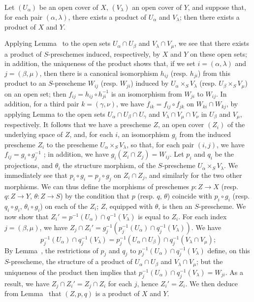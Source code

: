 \begin{lemma}[3.2.6.3]
\label{I.3.2.6.3}
Let $(U_\alpha)$ be an open cover of $X$, $(V_\lambda)$ an open cover of $Y$, and suppose
that, for each pair $(\alpha,\lambda)$, there exists a product of $U_\alpha$ and $V_\lambda$;
then there exists a product of $X$ and $Y$.
\end{lemma}

Applying Lemma~ to the open sets $U_\alpha\cap U_\beta$ and
$V_\lambda\cap V_\mu$, we see that there exists a product of $S$-preschemes induced,
respectively, by $X$ and $Y$ on these open sets; in addition, the uniqueness of the product
shows that, if we set $i=(\alpha,\lambda)$ and $j=(\beta,\mu)$, then there is a canonical
isomorphism $h_{ij}$ (resp. $h_{ji}$) from this product to an $S$-prescheme $W_{ij}$
(resp. $W_{ji}$) induced by $U_\alpha\times_S V_\lambda$ (resp. $U_\beta\times_S V_\mu$) on
an open set; then $f_{ij}=h_{ij}\circ h_{ji}^{-1}$ is an isomorphism from $W_{ji}$ to
$W_{ij}$. In addition, for a third pair $k=(\gamma,\nu)$, we have
$f_{ik}=f_{ij}\circ f_{jk}$ on
$W_{ki}\cap W_{kj}$, by applying Lemma  to
the open sets $U_\alpha\cap U_\beta\cap U_\gamma$ and $V_\lambda\cap V_\mu\cap V_\nu$ in
$U_\beta$ and $V_\mu$, respectively. It follows that we have a prescheme $Z$, an open cover
$(Z_i)$ of the underlying space of $Z$, and, for each $i$, an isomorphism $g_i$ from the
induced prescheme
$Z_i$ to the prescheme $U_\alpha\times_S V_\lambda$, so that, for each pair $(i,j)$, we have
$f_{ij}=g_i\circ g_j^{-1}$ ; in addition, we have $g_i(Z_i\cap Z_j)=W_{ij}$.
Let $p_i$ and $q_i$ be the projections, and $\theta_i$ the structure morphism, of the
$S$-prescheme $U_\alpha\times_S V_\lambda$. We immediately see that
$p_i\circ g_i=p_j\circ g_j$ on $Z_i\cap Z_j$, and similarly for the two other morphisms. We
can thus define the morphisms of preschemes $p:Z\to X$ (resp. $q:Z\to Y$, $\theta:Z\to S$) by
the condition that $p$ (resp. $q$, $\theta$) coincide with $p_i\circ g_i$
(resp. $q_i\circ g_i$, $\theta_i\circ g_i$) on each of the $Z_i$; $Z$, equipped with
$\theta$, is then an $S$-prescheme. We now show that
$Z_i'=p^{-1}(U_\alpha)\cap q^{-1}(V_\lambda)$ is equal to $Z_i$. For each index
$j=(\beta,\mu)$, we have $Z_j\cap Z_i'=g_j^{-1}(p_j^{-1}(U_\alpha)\cap q_j^{-1}(V_\lambda))$.
We have
\[
  p_j^{-1}(U_\alpha)\cap q_j^{-1}(V_\lambda)
  =p_j^{-1}(U_\alpha\cap U_\beta)\cap q_j^{-1}(V_\lambda\cap V_\mu);
\]
By Lemma~, the restrictions of $p_j$ and $q_j$ to
$p_j^{-1}(U_\alpha)\cap q_j^{-1}(V_\lambda)$ define, on this $S$-prescheme, the structure of a
product of $U_\alpha\cap U_\beta$ and $V_\lambda\cap V_\mu$; but the uniqueness of the
product then implies that $p_j^{-1}(U_\alpha)\cap q_j^{-1}(V_\lambda)=W_{ji}$. As a result, we
have $Z_j\cap Z_i'=Z_j\cap Z_i$ for each $j$, hence $Z_i'=Z_i$. We then deduce from
Lemma~ that $(Z,p,q)$ is a product of $X$ and $Y$.

